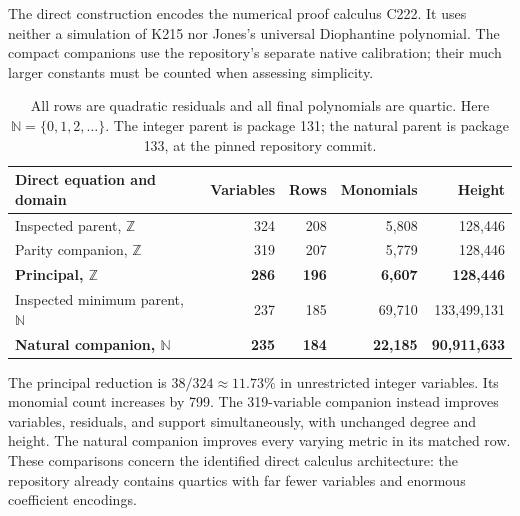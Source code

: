 \documentclass[11pt]{article}
\theoremstyle{remark}\newtheorem{remark}[theorem]{Remark}
\newcommand{\Z}{\mathbb Z}\newcommand{\N}{\mathbb N}
\begin{document}
The direct construction encodes the numerical proof calculus C222. It uses
neither a simulation of K215 nor Jones's universal Diophantine polynomial.
The compact companions use the repository's separate native calibration;
their much larger constants must be counted when assessing simplicity.

\begin{table}[ht]
\centering\small
\begin{tabular}{lrrrr}
\toprule
Direct equation and domain&Variables&Rows&Monomials&Height\\
\midrule
Inspected parent, $\Z$&324&208&5,808&128,446\\
Parity companion, $\Z$&319&207&5,779&128,446\\
\textbf{Principal, $\Z$}&\textbf{286}&\textbf{196}&\textbf{6,607}&\textbf{128,446}\\
Inspected minimum parent, $\N$&237&185&69,710&133,499,131\\
\textbf{Natural companion, $\N$}&\textbf{235}&\textbf{184}&\textbf{22,185}&\textbf{90,911,633}\\
\bottomrule
\end{tabular}
\caption{All rows are quadratic residuals and all final polynomials are
quartic. Here $\N=\{0,1,2,\ldots\}$. The integer parent is package 131;
the natural parent is package 133, at the pinned repository commit.}
\end{table}

The principal reduction is $38/324\approx11.73\%$ in unrestricted integer
variables. Its monomial count increases by 799. The 319-variable companion
instead improves variables, residuals, and support simultaneously, with
unchanged degree and height. The natural companion improves every varying
metric in its matched row. These comparisons concern the identified direct
calculus architecture: the repository already contains quartics with far
fewer variables and enormous coefficient encodings.
\end{document}

